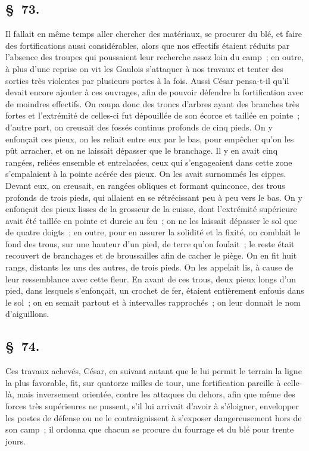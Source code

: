 \documentclass[french,twoside]{book} %
\begin{document}
\subsection[{§ 73.}]{ \textsc{§ 73.} }
\noindent Il fallait en même temps aller chercher des matériaux, se procurer du blé, et faire des fortifications aussi considérables, alors que nos effectifs étaient réduits par l’absence des troupes qui poussaient leur recherche assez loin du camp ; en outre, à plus d’une reprise on vit les Gaulois s’attaquer à nos travaux et tenter des sorties très violentes par plusieurs portes à la fois. Aussi César pensa-t-il qu’il devait encore ajouter à ces ouvrages, afin de pouvoir défendre la fortification avec de moindres effectifs. On coupa donc des troncs d’arbres ayant des branches très fortes et l’extrémité de celles-ci fut dépouillée de son écorce et taillée en pointe ; d’autre part, on creusait des fossés continus profonds de cinq pieds. On y enfonçait ces pieux, on les reliait entre eux par le bas, pour empêcher qu’on les pût arracher, et on ne laissait dépasser que le branchage. Il y en avait cinq rangées, reliées ensemble et entrelacées, ceux qui s’engageaient dans cette zone s’empalaient à la pointe acérée des pieux. On les avait surnommés les cippes. Devant eux, on creusait, en rangées obliques et formant quinconce, des trous profonds de trois pieds, qui allaient en se rétrécissant peu à peu vers le bas. On y enfonçait des pieux lisses de la grosseur de la cuisse, dont l’extrémité supérieure avait été taillée en pointe et durcie au feu ; on ne les laissait dépasser le sol que de quatre doigts ; en outre, pour en assurer la solidité et la fixité, on comblait le fond des trous, sur une hauteur d’un pied, de terre qu’on foulait ; le reste était recouvert de branchages et de broussailles afin de cacher le piège. On en fit huit rangs, distants les uns des autres, de trois pieds. On les appelait lis, à cause de leur ressemblance avec cette fleur. En avant de ces trous, deux pieux longs d’un pied, dans lesquels s’enfonçait, un crochet de fer, étaient entièrement enfouis dans le sol ; on en semait partout et à intervalles rapprochés ; on leur donnait le nom d’aiguillons.
\subsection[{§ 74.}]{ \textsc{§ 74.} }
\noindent Ces travaux achevés, César, en suivant autant que le lui permit le terrain la ligne la plus favorable, fit, sur quatorze milles de tour, une fortification pareille à celle-là, mais inversement orientée, contre les attaques du dehors, afin que même des forces très supérieures ne pussent, s’il lui arrivait d’avoir à s’éloigner, envelopper les postes de défense ou ne le contraignissent à s’exposer dangereusement hors de son camp ; il ordonna que chacun se procure du fourrage et du blé pour trente jours.
\end{document}
